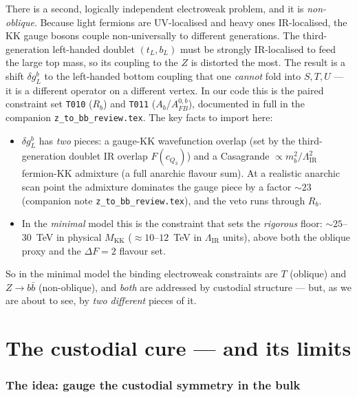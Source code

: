 \documentclass[11pt]{article}
\newcommand{\MKK}{M_{\mathrm{KK}}}
\newcommand{\LIR}{\Lambda_{\mathrm{IR}}}
\newcommand{\code}[1]{\texttt{#1}}
\newcommand{\dgL}{\delta g_L^b}
\newcommand{\Afb}{A_{FB}^{0,b}}
\theoremstyle{definition}
\begin{document}
There is a second, logically independent electroweak problem, and it is
\emph{non-oblique}. Because light fermions are UV-localised and heavy ones
IR-localised, the KK gauge bosons couple non-universally to different
generations. The third-generation left-handed doublet $(t_L,b_L)$ must be
strongly IR-localised to feed the large top mass, so its coupling to the $Z$ is
distorted the most. The result is a shift $\dgL$ to the left-handed bottom
coupling that one \emph{cannot} fold into $S,T,U$ --- it is a different operator on
a different vertex. In our code this is the paired constraint set \code{T010}
($R_b$) and \code{T011} ($A_b$/$\Afb$), documented in full in the companion
\code{z\_to\_bb\_review.tex}. The key facts to import here:
\begin{itemize}[leftmargin=1.4em]
\item $\dgL$ has \emph{two} pieces: a gauge-KK wavefunction overlap (set by the
third-generation doublet IR overlap $F(c_{Q_3})$) and a Casagrande
$\propto m_b^2/\LIR^2$ fermion-KK admixture (a full anarchic flavour sum). At a
realistic anarchic scan point the admixture dominates the gauge piece by a factor
$\sim 23$ (companion note \code{z\_to\_bb\_review.tex}), and the veto runs through
$R_b$.
\item In the \emph{minimal} model this is the constraint that sets the
\emph{rigorous} floor: $\sim 25$--$30$~TeV in physical $\MKK$
($\approx 10$--$12$~TeV in $\LIR$ units), above both the oblique proxy and the
$\Delta F=2$ flavour set.
\end{itemize}
So in the minimal model the binding electroweak constraints are $T$ (oblique) and
$Z\to b\bar b$ (non-oblique), and \emph{both} are addressed by custodial
structure --- but, as we are about to see, by \emph{two different} pieces of it.

\part{The custodial cure --- and its limits}
\label{part:cure}

\section{The idea: gauge the custodial symmetry in the bulk}
\label{sec:idea}
\end{document}
